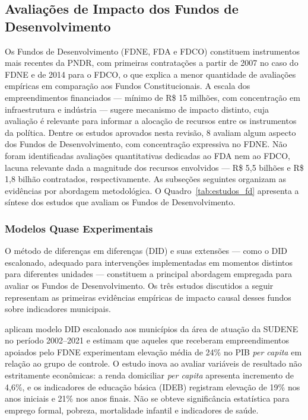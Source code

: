 \subsection{Avaliações de Impacto dos Fundos de Desenvolvimento}
\label{subsec:fd}

Os Fundos de Desenvolvimento (FDNE, FDA e FDCO) constituem instrumentos mais recentes da PNDR, com primeiras contratações a partir de 2007 no caso do FDNE e de 2014 para o FDCO, o que explica a menor quantidade de avaliações empíricas em comparação aos Fundos Constitucionais. A escala dos empreendimentos financiados --- mínimo de R\$ 15 milhões, com concentração em infraestrutura e indústria --- sugere mecanismo de impacto distinto, cuja avaliação é relevante para informar a alocação de recursos entre os instrumentos da política. Dentre os estudos aprovados nesta revisão, 8 avaliam algum aspecto dos Fundos de Desenvolvimento, com concentração expressiva no FDNE. Não foram identificadas avaliações quantitativas dedicadas ao FDA nem ao FDCO, lacuna relevante dada a magnitude dos recursos envolvidos --- R\$ 5,5 bilhões e R\$ 1,8 bilhão contratados, respectivamente. As subseções seguintes organizam as evidências por abordagem metodológica. O Quadro~\ref{tab:estudos_fd} apresenta a síntese dos estudos que avaliam os Fundos de Desenvolvimento.



\subsubsection{Modelos Quase Experimentais}

O método de diferenças em diferenças (DID) e suas extensões --- como o DID escalonado, adequado para intervenções implementadas em momentos distintos para diferentes unidades --- constituem a principal abordagem empregada para avaliar os Fundos de Desenvolvimento. Os três estudos discutidos a seguir representam as primeiras evidências empíricas de impacto causal desses fundos sobre indicadores municipais.

 aplicam modelo DID escalonado aos municípios da área de atuação da SUDENE no período 2002--2021 e estimam que aqueles que receberam empreendimentos apoiados pelo FDNE experimentam elevação média de 24\% no PIB \textit{per capita} em relação ao grupo de controle. O estudo inova ao avaliar variáveis de resultado não estritamente econômicas: a renda domiciliar \textit{per capita} apresenta incremento de 4,6\%, e os indicadores de educação básica (IDEB) registram elevação de 19\% nos anos iniciais e 21\% nos anos finais. Não se obteve significância estatística para emprego formal, pobreza, mortalidade infantil e indicadores de saúde.

